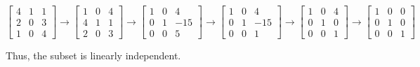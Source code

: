 \begin{ProbBox}
\begin{solution}
\[ \left[ \begin{array}{ccc}
4 & 1 & 1 \\
2 & 0 & 3 \\
1 & 0 & 4 
\end{array} \right]
%
\rightarrow
%
\left[ \begin{array}{ccc}
1 & 0 & 4 \\
4 & 1 & 1 \\
2 & 0 & 3 
\end{array} \right]
%
\rightarrow
%
\left[ \begin{array}{ccc}
1 & 0 & 4 \\
0 & 1 & -15 \\
0 & 0 & 5
\end{array} \right]
%
\rightarrow
%
\left[ \begin{array}{ccc}
1 & 0 & 4 \\
0 & 1 & -15 \\
0 & 0 & 1
\end{array} \right]
%
\rightarrow
%
\left[ \begin{array}{ccc}
1 & 0 & 4 \\
0 & 1 & 0 \\
0 & 0 & 1
\end{array} \right]
%
\rightarrow
%
\left[ \begin{array}{ccc}
1 & 0 & 0 \\
0 & 1 & 0 \\
0 & 0 & 1
\end{array} \right]
\]

Thus, the subset is linearly independent.

\end{solution}
\end{ProbBox}
\probskip


